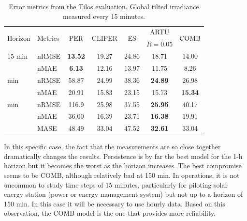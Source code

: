 \begin{table}[tb]
	\centering
	\begin{tabular}{@{}llccccc@{}}
		\toprule
		\multirow{2}{*}{Horizon} & \multirow{2}{*}{Metrics} & \multirow{2}{*}{PER} & \multirow{2}{*}{CLIPER} & \multirow{2}{*}{ES} &      ARTU      & \multirow{2}{*}{COMB} \\
		                         &                          &                       &                           &                     &   $R=0.05$   &                       \\ \midrule
		15 min                   & nRMSE                    &    \textbf{13.52}     &           19.27           &        24.86        &     18.71      &         14.00         \\
		                         & nMAE                     &     \textbf{6.13}     &           12.16           &        13.97        &     11.75      &         8.26          \\ \addlinespace
		75 min                   & nRMSE                    &         58.87         &           24.99           &        38.36        & \textbf{24.89} &         26.98         \\
		                         & nMAE                     &         20.91         &           15.83           &        23.15        &     15.73      &    \textbf{15.34}     \\ \addlinespace
		150 min                  & nRMSE                    &         116.9         &           25.98           &        37.55        & \textbf{25.95} &         40.17         \\
		                         & nMAE                     &         36.00         &           16.39           &        23.71        & \textbf{16.38} &         19.91         \\ \addlinespace
		                         & MASE                     &         48.49         &           33.04           &        47.52        & \textbf{32.61} &         33.04         \\ \bottomrule
	\end{tabular}
    \caption{Error metrics from the Tilos evaluation. Global tilted irradiance measured every 15 minutes.}
    \label{tab:4}
\end{table}

In this specific case, the fact that the measurements are so close together dramatically changes the results. Persistence is by far the best model for the 1-h horizon but it becomes the worst as the horizon increases. The best compromise seems to be COMB, although relatively bad at 150 min. In operations, it is not uncommon to study time steps of 15 minutes, particularly for piloting solar energy station (power or energy management system) but not up to a horizon of 150 min. In this case it will be necessary to use hourly data. Based on this observation, the COMB model is the one that provides more reliability.

